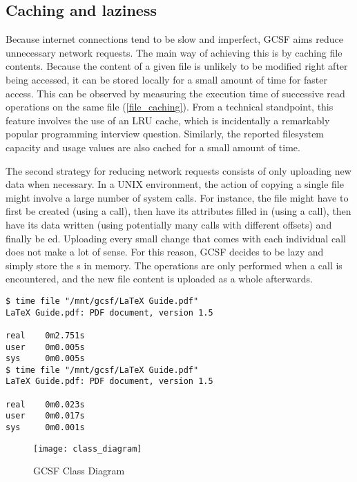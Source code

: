 \subsection{Caching and laziness}

Because internet connections tend to be slow and imperfect, GCSF aims reduce unnecessary network requests. The main way of achieving this is by caching file contents. Because the content of a given file is unlikely to be modified right after being accessed, it can be stored locally for a small amount of time for faster access. This can be observed by measuring the execution time of successive read operations on the same file (\ref{file_caching}). From a technical standpoint, this feature involves the use of an LRU cache, which is incidentally a remarkably popular programming interview question. Similarly, the reported filesystem capacity and usage values are also cached for a small amount of time.

The second strategy for reducing network requests consists of only uploading new data when necessary. In a UNIX environment, the action of copying a single file might involve a large number of system calls. For instance, the file might have to first be created (using a  call), then have its attributes filled in (using a  call), then have its data written (using potentially many  calls with different offsets) and finally be ed. Uploading every small change that comes with each individual  call does not make a lot of sense. For this reason, GCSF decides to be lazy and simply store the s in memory. The operations are only performed when a  call is encountered, and the new file content is uploaded as a whole afterwards.


\begin{lstlisting}[caption=File caching, frame=single, label=file_caching]
$ time file "/mnt/gcsf/LaTeX Guide.pdf"
LaTeX Guide.pdf: PDF document, version 1.5

real    0m2.751s
user    0m0.005s
sys     0m0.005s
$ time file "/mnt/gcsf/LaTeX Guide.pdf"
LaTeX Guide.pdf: PDF document, version 1.5

real    0m0.023s
user    0m0.017s
sys     0m0.001s
\end{lstlisting}


\begin{figure}[bpt]
\caption{GCSF Class Diagram}
\label{fig:gcsf_class_diagram}
\centering
\texttt{[image: class\_diagram]}
\end{figure}


